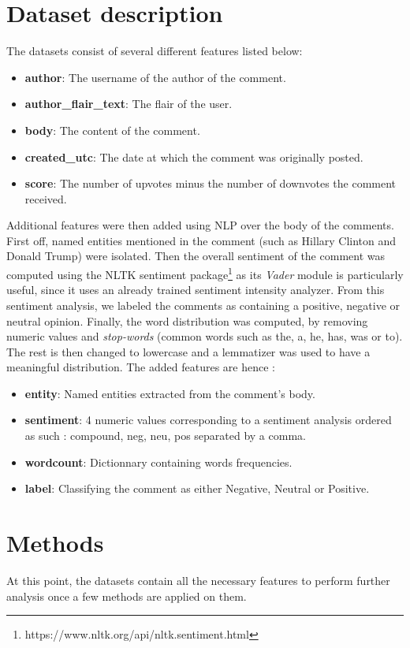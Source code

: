 \documentclass[11pt]{article}
\begin{document}
\section{Dataset description}
The datasets consist of several different features listed below:
\begin{itemize}
    \item \textbf{author}: The username of the author of the comment.
    \item \textbf{author\_flair\_text}: The flair of the user.
    \item \textbf{body}: The content of the comment.
    \item \textbf{created\_utc}: The date at which the comment was originally posted.
    \item \textbf{score}: The number of upvotes minus the number of downvotes the comment received.
\end{itemize}
Additional features were then added using NLP over the body of the comments. First off, named entities mentioned in the comment (such as Hillary Clinton and Donald Trump) were isolated. Then the overall sentiment of the comment was computed using the NLTK sentiment package\footnote{https://www.nltk.org/api/nltk.sentiment.html} as its \textit{Vader} module is particularly useful, since it uses an already trained sentiment intensity analyzer. From this sentiment analysis, we labeled the comments as containing a positive, negative or neutral opinion. Finally, the word distribution was computed, by removing numeric values and \textit{stop-words} (common words such as the, a, he, has, was or to). The rest is then changed to lowercase and a lemmatizer was used to have a meaningful distribution. The added features are hence : 
\begin{itemize}
    \item \textbf{entity}: Named entities extracted from the comment's body.
    \item \textbf{sentiment}: 4 numeric values corresponding to a sentiment analysis ordered as such : compound, neg, neu, pos separated by a comma.
    \item \textbf{wordcount}: Dictionnary containing words frequencies.
    \item \textbf{label}: Classifying the comment as either Negative, Neutral or Positive.
\end{itemize}


\section{Methods}
At this point, the datasets contain all the necessary features to perform further analysis once a few methods are applied on them.
\end{document}
